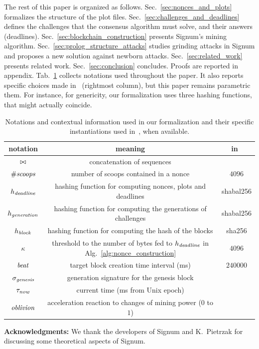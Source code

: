 The rest of this paper is organized as follows.
Sec.~\ref{sec:nonces_and_plots} formalizes the structure of the plot files.
Sec.~\ref{sec:challenges_and_deadlines} defines the challenges that the consensus
algorithm must solve, and their answers (deadlines).
Sec.~\ref{sec:blockchain_construction} presents Signum's mining algorithm.
Sec.~\ref{sec:prolog_structure_attacks} studies grinding attacks
in Signum and proposes a new solution against newborn attacks.
Sec.~\ref{sec:related_work} presents related work.
Sec.~\ref{sec:conclusion} concludes. Proofs are reported in appendix.
Tab.~\ref{tab:notations} collects notations used throughout the paper.
It also reports specific choices
made in~\cite{SignumPlotting} (rightmost column), but this paper remains parametric \wrt them.
For instance, for genericity,
our formalization uses three hashing functions, that might actually coincide.

\begin{table}[t]
\begin{center}
\begin{tabular}{|c|c|c|}
  \hline
  \textbf{notation} & \textbf{meaning} & \textbf{in~\cite{SignumPlotting}}\\\hline\hline

  $\operatorname*{\bowtie}$ & concatenation of sequences & \\\hline
  ${\#\mathit{scoops}}$ & number of scoops contained in a nonce & $4096$\\\hline

  $h_{\mathit{deadline}}$ & hashing function for computing nonces, plots and deadlines & shabal256\\\hline

  $h_{\mathit{generation}}$ & hashing function for computing the generations of challenges & shabal256\\\hline

  $h_{\mathit{block}}$ & hashing function for computing the hash of the blocks & sha256 \\\hline

  $\kappa$ & threshold to the number of bytes fed to $h_{\mathit{deadline}}$ in Alg.~\ref{alg:nonce_construction} & $4096$\\\hline

  ${\mathit{beat}}$ & target block creation time interval (ms) & $240000$ \\\hline

  $\sigma_{\mathit{genesis}}$ & generation signature for the genesis block & \\\hline

  $\tau_{\mathit{now}}$ & current time (ms from Unix epoch) & \\\hline

  ${\mathit{oblivion}}$ & acceleration reaction to changes of mining power ($0$ to $1$) & \\\hline
\end{tabular}
\end{center}
\caption{Notations and contextual information used in our formalization and their specific instantiations
  used in~\cite{SignumPlotting}, when available.}
\label{tab:notations}
\end{table}

\vspace*{1ex}
\textbf{Acknowledgments:}
We thank the developers of Signum
and K.\ Pietrzak for discussing some
theoretical aspects of Signum.
